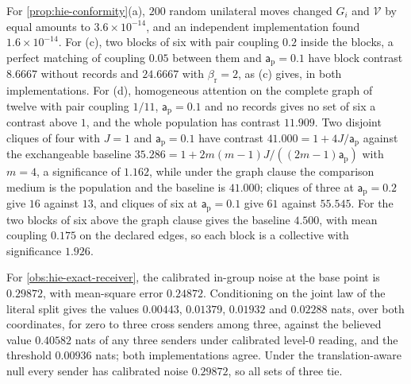 \begin{numcheck}\label{chk:hie-conformity}
For \cref{prop:hie-conformity}(a), $200$ random unilateral moves changed $G_i$ and $\mathcal V$ by equal amounts to $3.6\times10^{-14}$, and an independent implementation found $1.6\times10^{-14}$. For (c), two blocks of six with pair coupling $0.2$ inside the blocks, a perfect matching of coupling $0.05$ between them and $\mathsf a_{\mathrm p}=0.1$ have block contrast $8.6667$ without records and $24.6667$ with $\beta_{\mathrm r}=2$, as (c) gives, in both implementations. For (d), homogeneous attention on the complete graph of twelve with pair coupling $1/11$, $\mathsf a_{\mathrm p}=0.1$ and no records gives no set of six a contrast above $1$, and the whole population has contrast $11.909$. Two disjoint cliques of four with $J=1$ and $\mathsf a_{\mathrm p}=0.1$ have contrast $41.000=1+4J/\mathsf a_{\mathrm p}$ against the exchangeable baseline $35.286=1+2m(m-1)J/((2m-1)\mathsf a_{\mathrm p})$ with $m=4$, a significance of $1.162$, while under the graph clause the comparison medium is the population and the baseline is $41.000$; cliques of three at $\mathsf a_{\mathrm p}=0.2$ give $16$ against $13$, and cliques of six at $\mathsf a_{\mathrm p}=0.1$ give $61$ against $55.545$. For the two blocks of six above the graph clause gives the baseline $4.500$, with mean coupling $0.175$ on the declared edges, so each block is a collective with significance $1.926$.

For \cref{obs:hie-exact-receiver}, the calibrated in-group noise at the base point is $0.29872$, with mean-square error $0.24872$. Conditioning on the joint law of the literal split gives the values $0.00443$, $0.01379$, $0.01932$ and $0.02288$ nats, over both coordinates, for zero to three cross senders among three, against the believed value $0.40582$ nats of any three senders under calibrated level-0 reading, and the threshold $0.00936$ nats; both implementations agree. Under the translation-aware null every sender has calibrated noise $0.29872$, so all sets of three tie.


\end{numcheck}
